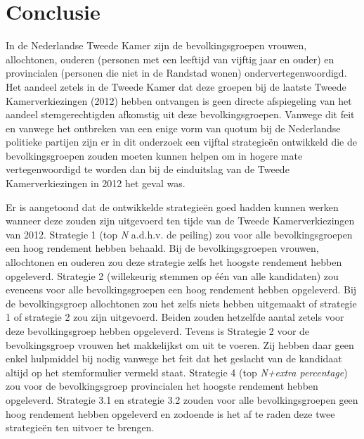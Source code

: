 \newpage
\section{Conclusie}
In de Nederlandse Tweede Kamer zijn de bevolkingsgroepen vrouwen, allochtonen, ouderen (personen met een leeftijd van vijftig jaar en ouder) en provincialen (personen die niet in de Randstad wonen) ondervertegenwoordigd. Het aandeel zetels in de Tweede Kamer dat deze groepen bij de laatste Tweede Kamerverkiezingen (2012) hebben ontvangen is geen directe afspiegeling van het aandeel stemgerechtigden afkomstig uit deze bevolkingsgroepen. Vanwege dit feit en vanwege het ontbreken van een enige vorm van quotum bij de Nederlandse politieke partijen zijn er in dit onderzoek een vijftal strategie\"{e}n ontwikkeld die de bevolkingsgroepen zouden moeten kunnen helpen om in hogere mate vertegenwoordigd te worden dan bij de einduitslag van de Tweede Kamerverkiezingen in 2012 het geval was. 

Er is aangetoond dat de ontwikkelde strategie\"{e}n goed hadden kunnen werken wanneer deze zouden zijn uitgevoerd ten tijde van de Tweede Kamerverkiezingen van 2012. Strategie 1 (top \textit{N} a.d.h.v. de peiling) zou voor alle bevolkingsgroepen een hoog rendement hebben behaald. Bij de bevolkingsgroepen vrouwen, allochtonen en ouderen zou deze strategie zelfs het hoogste rendement hebben opgeleverd. Strategie 2 (willekeurig stemmen op één van alle kandidaten) zou eveneens voor alle bevolkingsgroepen een hoog rendement hebben opgeleverd. Bij de bevolkingsgroep allochtonen zou het zelfs niets hebben uitgemaakt of strategie 1 of strategie 2 zou zijn uitgevoerd. Beiden zouden hetzelfde aantal zetels voor deze bevolkingsgroep hebben opgeleverd. Tevens is Strategie 2 voor de bevolkingsgroep vrouwen het makkelijkst om uit te voeren. Zij hebben daar geen enkel hulpmiddel bij nodig vanwege het feit dat het geslacht van de kandidaat altijd op het stemformulier vermeld staat. Strategie 4 (top \textit{N+extra percentage}) zou voor de bevolkingsgroep provincialen het hoogste rendement hebben opgeleverd. Strategie 3.1 en strategie 3.2 zouden voor alle bevolkingsgroepen geen hoog rendement hebben opgeleverd en zodoende is het af te raden deze twee strategie\"{e}n ten uitvoer te brengen.

